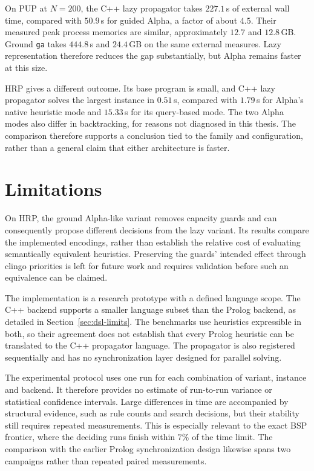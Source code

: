 On PUP at $N=200$, the C++ lazy propagator takes $227.1$\,s of external wall time, compared with $50.9$\,s for guided Alpha, a factor of about $4.5$. Their measured peak process memories are similar, approximately $12.7$ and $12.8$\,GB. Ground \texttt{ga} takes $444.8$\,s and $24.4$\,GB on the same external measures. Lazy representation therefore reduces the gap substantially, but Alpha remains faster at this size.

HRP gives a different outcome. Its base program is small, and C++ lazy propagator solves the largest instance in $0.51$\,s, compared with $1.79$\,s for Alpha's native heuristic mode and $15.33$\,s for its query-based mode. The two Alpha modes also differ in backtracking, for reasons not diagnosed in this thesis. The comparison therefore supports a conclusion tied to the family and configuration, rather than a general claim that either architecture is faster.

\section{Limitations}

On HRP, the ground Alpha-like variant removes capacity guards and can consequently propose different decisions from the lazy variant. Its results compare the implemented encodings, rather than establish the relative cost of evaluating semantically equivalent heuristics. Preserving the guards' intended effect through clingo priorities is left for future work and requires validation before such an equivalence can be claimed.

The implementation is a research prototype with a defined language scope. The C++ backend supports a smaller language subset than the Prolog backend, as detailed in Section~\ref{sec:dsl-limits}. The benchmarks use heuristics expressible in both, so their agreement does not establish that every Prolog heuristic can be translated to the C++ propagator language. The propagator is also registered sequentially and has no synchronization layer designed for parallel solving.

The experimental protocol uses one run for each combination of variant, instance and backend. It therefore provides no estimate of run-to-run variance or statistical confidence intervals. Large differences in time are accompanied by structural evidence, such as rule counts and search decisions, but their stability still requires repeated measurements. This is especially relevant to the exact BSP frontier, where the deciding runs finish within $7\%$ of the time limit. The comparison with the earlier Prolog synchronization design likewise spans two campaigns rather than repeated paired measurements.

